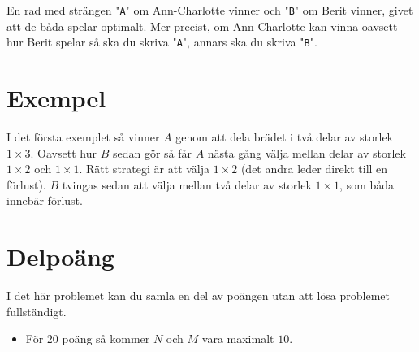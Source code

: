 En rad med strängen "\texttt{A}" om Ann-Charlotte vinner och "\texttt{B}" om
Berit vinner, givet att de båda spelar optimalt. Mer precist, om Ann-Charlotte
kan vinna oavsett hur Berit spelar så ska du skriva "\texttt{A}", annars ska du
skriva "\texttt{B}".

\section*{Exempel}
I det första exemplet så vinner $A$ genom att dela brädet i två delar av storlek
$1 \times 3$. Oavsett hur $B$ sedan gör så får $A$ nästa gång välja mellan
delar av storlek $1 \times 2$ och $1 \times 1$. Rätt strategi är att välja $1
\times 2$ (det andra leder direkt till en förlust). $B$ tvingas sedan att välja
mellan två delar av storlek $1 \times 1$, som båda innebär förlust.

\section*{Delpoäng}

I det här problemet kan du samla en del av poängen utan att
lösa problemet fullständigt.

\begin{itemize}
    \item För $20$ poäng så kommer $N$ och $M$ vara maximalt $10$.
\end{itemize}
